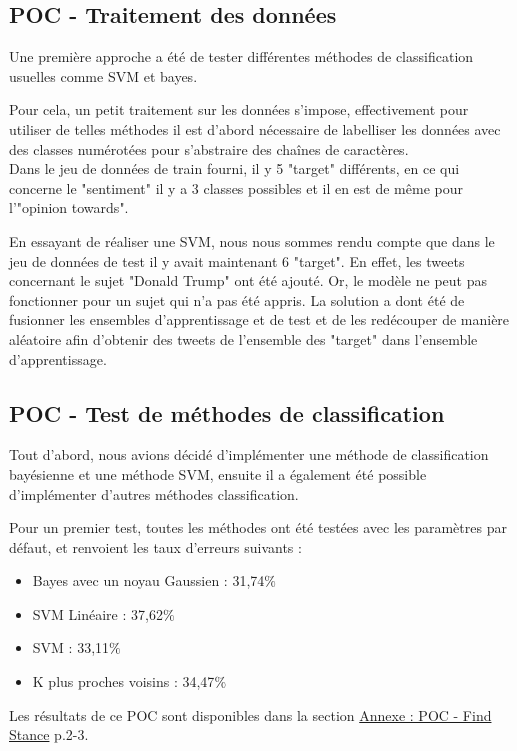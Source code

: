 \subsection{POC - Traitement des données}

Une première approche a été de tester différentes méthodes de classification usuelles comme SVM et bayes.

Pour cela, un petit traitement sur les données s'impose, effectivement pour utiliser de telles méthodes il est d'abord nécessaire de labelliser les données avec des classes numérotées pour s'abstraire des chaînes de caractères. \\
Dans le jeu de données de train fourni, il y 5 "target" différents, en ce qui concerne le "sentiment" il y a 3 classes possibles et il en est de même pour l'"opinion towards".

En essayant de réaliser une SVM, nous nous sommes rendu compte que dans le jeu de données de test il y avait maintenant 6 "target". En effet, les tweets concernant le sujet "Donald Trump" ont été ajouté. Or, le modèle ne peut pas fonctionner pour un sujet qui n'a pas été appris. 
La solution a dont été de fusionner les ensembles d'apprentissage et de test et de les redécouper de manière aléatoire afin d'obtenir des tweets de l'ensemble des "target" dans l'ensemble d'apprentissage.

\subsection{POC - Test de méthodes de classification}

Tout d'abord, nous avions décidé d'implémenter une méthode de classification bayésienne et une méthode SVM, ensuite il a également été possible d'implémenter d'autres méthodes classification.

Pour un premier test, toutes les méthodes ont été testées avec les paramètres par défaut, et renvoient les taux d'erreurs suivants :
\begin{itemize}
\item Bayes avec un noyau Gaussien : 31,74$\%$
\item SVM Linéaire : 37,62$\%$
\item SVM : 33,11$\%$
\item K plus proches voisins : 34,47$\%$
\end{itemize}

Les résultats de ce POC sont disponibles dans la section \hyperref[annexe-stance-detection]{Annexe : POC - Find Stance} p.2-3.

